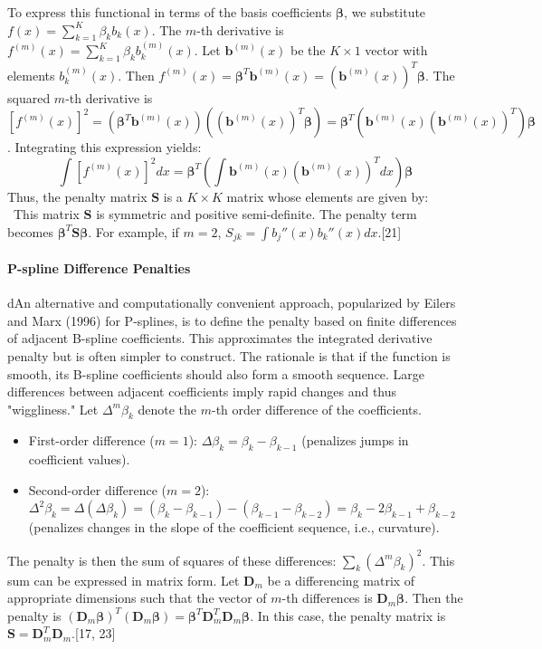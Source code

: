 \documentclass[11pt, a4paper]{article}
\begin{document}
\begin{itemize}
To express this functional in terms of the basis coefficients $\boldsymbol{\beta}$, we substitute $f(x) = \sum_{k=1}^{K} \beta_k b_k(x)$. The $m$-th derivative is $f^{(m)}(x) = \sum_{k=1}^{K} \beta_k b_k^{(m)}(x)$. Let $\mathbf{b}^{(m)}(x)$ be the $K \times 1$ vector with elements $b_k^{(m)}(x)$. Then $f^{(m)}(x) = \boldsymbol{\beta}^T \mathbf{b}^{(m)}(x) = (\mathbf{b}^{(m)}(x))^T \boldsymbol{\beta}$.
The squared $m$-th derivative is $[f^{(m)}(x)]^2 = (\boldsymbol{\beta}^T \mathbf{b}^{(m)}(x)) ((\mathbf{b}^{(m)}(x))^T \boldsymbol{\beta}) = \boldsymbol{\beta}^T \left( \mathbf{b}^{(m)}(x) (\mathbf{b}^{(m)}(x))^T \right) \boldsymbol{\beta}$.
Integrating this expression yields:
\[ \int [f^{(m)}(x)]^2 dx = \boldsymbol{\beta}^T \left( \int \mathbf{b}^{(m)}(x) (\mathbf{b}^{(m)}(x))^T dx \right) \boldsymbol{\beta} \]
Thus, the penalty matrix $\mathbf{S}$ is a $K \times K$ matrix whose elements are given by:
\
This matrix $\mathbf{S}$ is symmetric and positive semi-definite. The penalty term becomes $\boldsymbol{\beta}^T \mathbf{S} \boldsymbol{\beta}$. For example, if $m=2$, $S_{jk} = \int b_j''(x) b_k''(x) dx$.[21]

\paragraph{P-spline Difference Penalties}
dAn alternative and computationally convenient approach, popularized by Eilers and Marx (1996) for P-splines, is to define the penalty based on finite differences of adjacent B-spline coefficients. This approximates the integrated derivative penalty but is often simpler to construct.
The rationale is that if the function is smooth, its B-spline coefficients should also form a smooth sequence. Large differences between adjacent coefficients imply rapid changes and thus "wiggliness."
Let $\Delta^m \beta_k$ denote the $m$-th order difference of the coefficients.
\begin{itemize}
 \item First-order difference ($m=1$): $\Delta \beta_k = \beta_k - \beta_{k-1}$ (penalizes jumps in coefficient values).
 \item Second-order difference ($m=2$): $\Delta^2 \beta_k = \Delta(\Delta \beta_k) = (\beta_k - \beta_{k-1}) - (\beta_{k-1} - \beta_{k-2}) = \beta_k - 2\beta_{k-1} + \beta_{k-2}$ (penalizes changes in the slope of the coefficient sequence, i.e., curvature).
\end{itemize}
The penalty is then the sum of squares of these differences: $\sum_{k} (\Delta^m \beta_k)^2$.
This sum can be expressed in matrix form. Let $\mathbf{D}_m$ be a differencing matrix of appropriate dimensions such that the vector of $m$-th differences is $\mathbf{D}_m \boldsymbol{\beta}$. Then the penalty is $(\mathbf{D}_m \boldsymbol{\beta})^T (\mathbf{D}_m \boldsymbol{\beta}) = \boldsymbol{\beta}^T \mathbf{D}_m^T \mathbf{D}_m \boldsymbol{\beta}$.
In this case, the penalty matrix is $\mathbf{S} = \mathbf{D}_m^T \mathbf{D}_m$.[17, 23]


\end{itemize}
\end{document}
